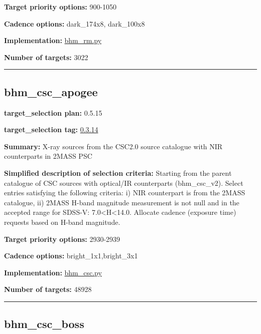 \noindent\textbf{Target priority options:} 900-1050

\noindent\textbf{Cadence options:} dark\_174x8, dark\_100x8

\noindent\textbf{Implementation:}
\href{https://github.com/sdss/target_selection/blob/0.3.0/python/target_selection/cartons/bhm_rm.py}{bhm\_rm.py}

\noindent\textbf{Number of targets:} 3022

\begin{center}\rule{0.5\linewidth}{0.5pt}\end{center}

\hypertarget{bhm_csc_apogee_plan0.5.15}{%
\subsection{bhm\_csc\_apogee}\label{bhm_csc_apogee_plan0.5.15}}

\noindent\textbf{target\_selection plan:} 0.5.15

\noindent\textbf{target\_selection tag:}
\href{https://github.com/sdss/target_selection/tree/0.3.14/}{0.3.14}

\noindent\textbf{Summary:} X-ray sources from the CSC2.0 source catalogue with
NIR counterparts in 2MASS PSC

\noindent\textbf{Simplified description of selection criteria:} Starting from the
parent catalogue of CSC sources with optical/IR counterparts
(bhm\_csc\_v2). Select entries satisfying the following criteria: i) NIR
counterpart is from the 2MASS catalogue, ii) 2MASS H-band magnitude
measurement is not null and in the accepted range for SDSS-V:
7.0\textless{}H\textless{}14.0. Allocate cadence (exposure time)
requests based on H-band magnitude.


\noindent\textbf{Target priority options:} 2930-2939

\noindent\textbf{Cadence options:} bright\_1x1,bright\_3x1

\noindent\textbf{Implementation:}
\href{https://github.com/sdss/target_selection/blob/0.3.14/python/target_selection/cartons/bhm_csc.py}{bhm\_csc.py}

\noindent\textbf{Number of targets:} 48928

\begin{center}\rule{0.5\linewidth}{0.5pt}\end{center}

\hypertarget{bhm_csc_boss_plan0.5.15}{%
\subsection{bhm\_csc\_boss}\label{bhm_csc_boss_plan0.5.15}}


